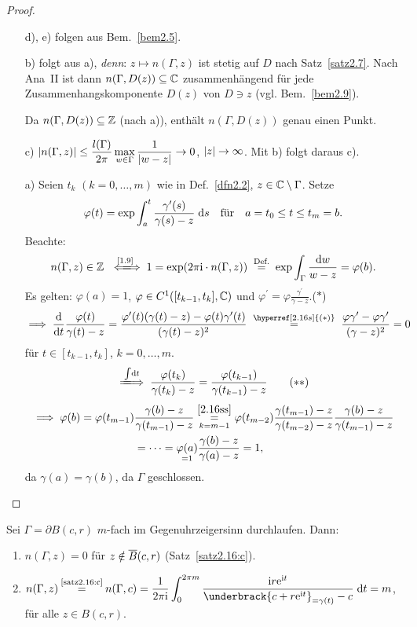 \documentclass[a4paper,twoside,DIV15,BCOR12mm]{scrbook}
\begin{document}
\begin{proof}\begin{itemize}
\item[d),]e) folgen aus Bem.~\ref{bem2.5}.

\item[b)] folgt aus a), \textit{denn}: $z\mapsto n(\Gamma,z)$ ist stetig auf $D$ nach Satz~\ref{satz2.7}. Nach Ana~II ist dann $n(\Gamma,D(z))\subseteq\mathbb{C}$ zusammenhängend für jede Zusammenhangskomponente $D(z)$ von $D\ni z$ (vgl. Bem.~\ref{bem2.9}).

Da $n(\Gamma,D(z))\subseteq\mathbb{Z}$ (nach a)), enthält $n(\Gamma,D(z))$ genau einen Punkt.

\item[c)] $\displaystyle\left\lvert n(\Gamma,z)\right\lvert\leq\frac{l(\Gamma)}{2\pi}\max_{w\in\Gamma}\frac{1}{\left\lvert w-z\right\lvert}\rightarrow 0$, $\left\lvert z\right\lvert\rightarrow\infty$. Mit b) folgt daraus c).

\item[a)] Seien $t_k$ $(k=0,\dotsc,m)$ wie in Def.~\ref{dfn2.2}, $z\in\mathbb{C}\setminus\Gamma$. Setze 
\[\varphi(t) = \exp\int_{a}^{t}{\frac{\gamma^\prime(s)}{\gamma(s)-z}}\;\mathrm{d} s\quad\text{für}\quad a = t_0\leq t\leq t_m = b.\]
Beachte:
\[n(\Gamma,z)\in\set{Z}\gdwnach{\eqref{1.9}} 1 = \exp(2\pi\i\cdot n(\Gamma,z)) \nach{=}{Def.} \exp\int_\Gamma\frac{\d w}{w-z} = \varphi(b).\]
Es gelten: $\varphi(a) = 1$, $\varphi\in C^1([t_{k-1},t_k],\mathbb{C})$ und $\varphi^\prime = \varphi\frac{\gamma^\prime}{\gamma-z}$.\label{2.16s}\hfill($*$)
\[\folgt \frac{\d}{\d t}\frac{\varphi(t)}{\gamma(t) - z} = \frac{\varphi^\prime(t)(\gamma(t)-z)-\varphi(t)\gamma^\prime(t)}{(\gamma(t)-z)^2} \wegen{=}{\hyperref[2.16s]{(*)}} \frac{\varphi\gamma^\prime-\varphi\gamma^\prime}{(\gamma-z)^2} = 0\]
für $t\in[t_{k-1},t_k]$, $k=0,\dotsc,m$.
\[\label{2.16ss}\folgtwegen{\int\!\d t}\frac{\varphi(t_k)}{\gamma(t_k)-z} = \frac{\varphi(t_{k-1})}{\gamma(t_{k-1})-z}\tag{$**$}\]
\begin{align*}
\implies\varphi(b)=\varphi(t_{m-1})&\frac{\gamma(b)-z}{\gamma(t_{m-1})-z} \overset{\eqref{2.16ss}}{\underset{k=m-1}{=}} \varphi(t_{m-2})\frac{\gamma(t_{m-1})-z}{\gamma(t_{m-2})-z}\frac{\gamma(b)-z}{\gamma(t_{m-1})-z}\\& = \dotsb = \underset{=1}{\varphi(a)}\frac{\gamma(b)-z}{\gamma(a)-z} = 1,
\end{align*}
da $\gamma(a) = \gamma(b)$, da $\Gamma$ geschlossen.\qedhere
\end{itemize}
\end{proof}

\begin{bsp}\label{bsp2.17}
Sei $\Gamma = \partial B(c,r)$ $m$-fach im Gegenuhrzeigersinn durchlaufen. Dann:
\begin{enumerate}
\item $n(\Gamma,z) = 0$ für $z\notin \overline{B}(c,r)$ (Satz~\ref{satz2.16:c}).
\item $\displaystyle n(\Gamma,z)\!\! \nach{=}{\ref{satz2.16:c}}\!\! n(\Gamma,c) = \frac{1}{2\pi\i}\integral{0}{2\pi
    m}{\frac{\i r\e^{\i t}}{\underbrack{c+r\e^{\i t}}_{=\gamma(t)}-c}}{t} = m$, für alle $z\in B(c,r)$.
\end{enumerate}
\end{bsp}
\end{document}
